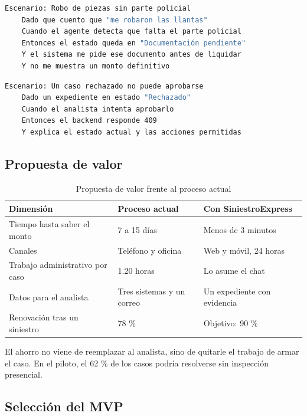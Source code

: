 \documentclass[12pt,letterpaper]{article}
\begin{document}
\begin{lstlisting}[language=bash, caption={Escenario de documentación pendiente}, label={lst:gherkin2}]
  Escenario: Robo de piezas sin parte policial
    Dado que cuento que "me robaron las llantas"
    Cuando el agente detecta que falta el parte policial
    Entonces el estado queda en "Documentación pendiente"
    Y el sistema me pide ese documento antes de liquidar
    Y no me muestra un monto definitivo
\end{lstlisting}

\begin{lstlisting}[language=bash, caption={Escenario de transición no permitida}, label={lst:gherkin3}]
  Escenario: Un caso rechazado no puede aprobarse
    Dado un expediente en estado "Rechazado"
    Cuando el analista intenta aprobarlo
    Entonces el backend responde 409
    Y explica el estado actual y las acciones permitidas
\end{lstlisting}

\subsection{Propuesta de valor}

\begin{table}[H]
\centering
\caption{Propuesta de valor frente al proceso actual}
\label{tab:valor}
\small
\begin{tabular}{p{4.4cm}p{4.6cm}p{4.6cm}}
\toprule
\textbf{Dimensión} & \textbf{Proceso actual} & \textbf{Con SiniestroExpress} \\
\midrule
Tiempo hasta saber el monto & 7 a 15 días & Menos de 3 minutos \\
Canales & Teléfono y oficina & Web y móvil, 24 horas \\
Trabajo administrativo por caso & 1.20 horas & Lo asume el chat \\
Datos para el analista & Tres sistemas y un correo & Un expediente con evidencia \\
Renovación tras un siniestro & 78 \% & Objetivo: 90 \% \\
\bottomrule
\end{tabular}
\end{table}

El ahorro no viene de reemplazar al analista, sino de quitarle el trabajo de armar el
caso. En el piloto, el 62 \% de los casos podría resolverse sin inspección presencial.

\subsection{Selección del MVP}
\end{document}
